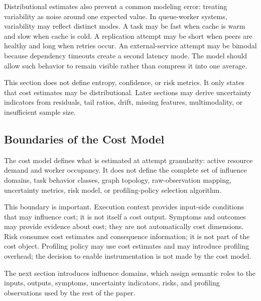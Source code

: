 Distributional estimates also prevent a common modeling error: treating
variability as noise around one expected value. In queue-worker systems,
variability may reflect distinct modes. A task may be fast when cache is warm
and slow when cache is cold. A replication attempt may be short when peers are
healthy and long when retries occur. An external-service attempt may be bimodal
because dependency timeouts create a second latency mode. The model should allow
such behavior to remain visible rather than compress it into one average.

This section does not define entropy, confidence, or risk metrics. It only
states that cost estimates may be distributional. Later sections may derive
uncertainty indicators from residuals, tail ratios, drift, missing features,
multimodality, or insufficient sample size.

\subsection{Boundaries of the Cost Model}
\label{sec:cost-model-boundaries}

The cost model defines what is estimated at attempt granularity:
active resource demand and worker occupancy. It does not define the complete
set of influence domains, task behavior classes, graph topology, raw-observation
mapping, uncertainty metrics, risk model, or profiling-policy selection
algorithm.

This boundary is important. Execution context provides input-side conditions
that may influence cost; it is not itself a cost output. Symptoms and outcomes
may provide evidence about cost; they are not automatically cost dimensions.
Risk consumes cost estimates and consequence information; it is not part of the
cost object. Profiling policy may use cost estimates and may introduce profiling
overhead; the decision to enable instrumentation is not made by the cost model.

The next section introduces influence domains, which assign semantic roles to
the inputs, outputs, symptoms, uncertainty indicators, risks, and profiling
observations used by the rest of the paper.
